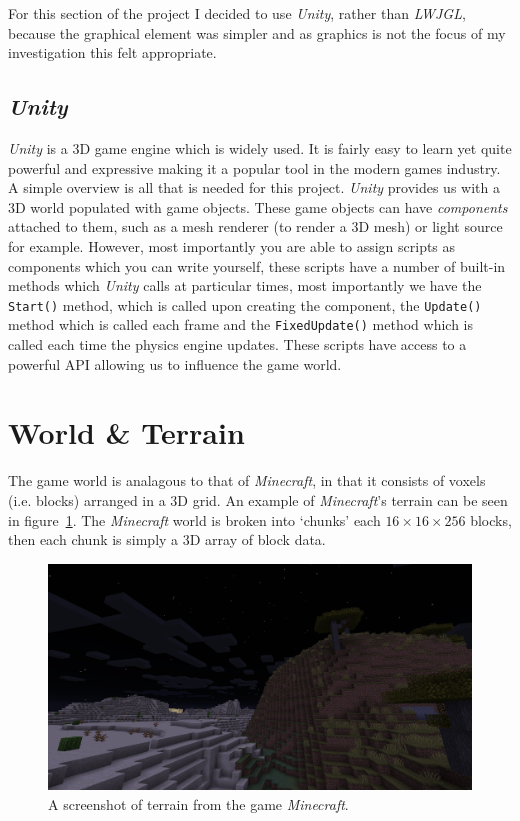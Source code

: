 \documentclass[12pt,notitlepage,a4paper]{report}
\newcommand{\unity}{\emph{Unity}}
\begin{document}
	For this section of the project I decided to use \unity, rather than \emph{LWJGL}, because the graphical element was simpler and as graphics is not the focus of my investigation this felt appropriate.
	
	\subsection{\unity}
	\unity{} is a 3D game engine which is widely used. It is fairly easy to learn yet quite powerful and expressive making it a popular tool in the modern games industry. A simple overview is all that is needed for this project. \unity{} provides us with a 3D world populated with game objects. These game objects can have \emph{components} attached to them, such as a mesh renderer (to render a 3D mesh) or light source for example. However, most importantly you are able to assign scripts as components which you can write yourself, these scripts have a number of built-in methods which \unity{} calls at particular times, most importantly we have the {\tt Start()} method, which is called upon creating the component, the {\tt Update()} method which is called each frame and the {\tt FixedUpdate()} method which is called each time the physics engine updates. These scripts have access to a powerful API allowing us to influence the game world.
	
	\section{World \& Terrain}
	The game world is analagous to that of \emph{Minecraft}, in that it consists of voxels (i.e. blocks) arranged in a 3D grid. An example of \emph{Minecraft}'s terrain can be seen in figure~\ref{fig:minecraft}. The \emph{Minecraft} world is broken into `chunks' each $16\times16\times256$ blocks, then each chunk is simply a 3D array of block data.
	\begin{figure}[!ht]
		\includegraphics[width=\textwidth]{minecraft.png}
		\caption{A screenshot of terrain from the game \emph{Minecraft}.}
		\label{fig:minecraft}
	\end{figure}
\end{document}
